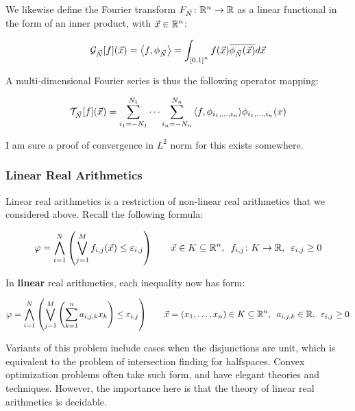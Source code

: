 \documentclass[12pt]{article}
\begin{document}
We likewise define the
Fourier transform ${F_{\vec{N}} \colon {\mathbb{R}}^n \to {\mathbb{R}}}$ as a
linear functional in the form of an inner product,
with $\vec{x} \in {\mathbb{R}}^n$:

\begin{align*}
  \mathcal{G}_{\vec{N}} {\left[f\right]} {\left(\vec{x}\right)}
    = {\left\langle f, \phi_{\vec{N}}\right\rangle}
    = \int_{{\left[0, 1\right]}^n}
      f{\left(\vec{x}\right)} \overline{\phi_{\vec{N}} {\left(\vec{x}\right)}} d \vec{x}
\end{align*}

A multi-dimensional Fourier series is thus the following operator mapping:

\begin{align*}
  \mathcal{T}_{\vec{N}} {\left[f\right]}{\left(\vec{x}\right)}
    = \sum_{i_1 = -N_1}^{N_1} \cdots \sum_{i_n = -N_n}^{N_n}
        {\left\langle f, \phi_{i_1, \ldots, i_n}\right\rangle} \phi_{i_1, \ldots, i_n} {\left(x\right)}
\end{align*}

I am sure a proof of convergence in $L^2$ norm for this exists somewhere.


\subsubsection{Linear Real Arithmetics}
Linear real arithmetics is a restriction of non-linear real arithmetics
that we considered above.
Recall the following formula:

\begin{align*}
  \varphi
    = \bigwedge_{i = 1}^{N} {\left(\bigvee_{j = 1}^{M}
        f_{i, j}{\left(\vec{x}\right)} \leq \varepsilon_{i, j}\right)}
  \qquad
  \vec{x} \in K \subseteq {\mathbb{R}}^n, \enskip
  {f_{i, j} \colon K \to {\mathbb{R}}}, \enskip
  \varepsilon_{i, j} \geq 0
\end{align*}

In \textbf{linear} real arithmetics, each inequality now has form:

\begin{align*}
  \varphi
    = \bigwedge_{i = 1}^{N} {\left(\bigvee_{j = 1}^{M}
        {\left(\sum_{k = 1}^{n} a_{i, j, k} x_k\right)} \leq \varepsilon_{i, j}\right)}
  \qquad
  \vec{x} = {\left(x_1, \ldots, x_n\right)} \in K \subseteq {\mathbb{R}}^n, \enskip
  a_{i, j, k} \in {\mathbb{R}}, \enskip
  \varepsilon_{i, j} \geq 0
\end{align*}

Variants of this problem include cases when the disjunctions
are unit, which is equivalent to the problem of intersection finding for
halfspaces.
Convex optimization problems often take such form, and have elegant
theories and techniques.
However, the importance here is that the theory of linear real arithmetics
is decidable.
\end{document}
